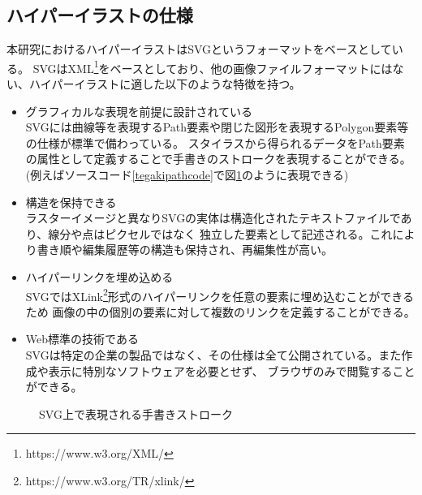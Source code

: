 \subsection{ハイパーイラストの仕様}
本研究におけるハイパーイラストはSVG\cite{aboutsvg}というフォーマットをベースとしている。
SVGはXML\footnote{https://www.w3.org/XML/}をベースとしており、他の画像ファイルフォーマットにはない、ハイパーイラストに適した以下のような特徴を持つ。
\begin{itemize}
    \item グラフィカルな表現を前提に設計されている\\
    SVGには曲線等を表現するPath要素や閉じた図形を表現するPolygon要素等の仕様が標準で備わっている。
    スタイラスから得られるデータをPath要素の属性として定義することで手書きのストロークを表現することができる。
    (例えばソースコード\ref{tegakipathcode}で図\ref{tegakipath}のように表現できる)
    \item 構造を保持できる\\
    ラスターイメージと異なりSVGの実体は構造化されたテキストファイルであり、線分や点はピクセルではなく
    独立した要素として記述される。これにより書き順や編集履歴等の構造も保持され、再編集性が高い。
    \item ハイパーリンクを埋め込める\\
    SVGではXLink\footnote{https://www.w3.org/TR/xlink/}形式のハイパーリンクを任意の要素に埋め込むことができるため
    画像の中の個別の要素に対して複数のリンクを定義することができる。
    \item Web標準の技術である\\
    SVGは特定の企業の製品ではなく、その仕様は全て公開されている。また作成や表示に特別なソフトウェアを必要とせず、
    ブラウザのみで閲覧することができる。
\end{itemize}

\begin{figure}[htbp]
    \begin{center}
         \end{center}
    \caption{SVG上で表現される手書きストローク} \label{tegakipath}
\end{figure}

